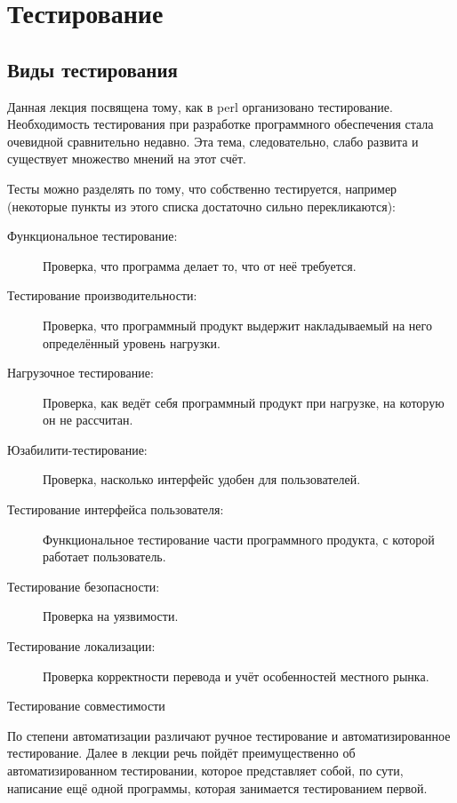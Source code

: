 \setcounter{chapter}{10}
\chapter{Тестирование}

\section{Виды тестирования}
Данная лекция посвящена тому, как в perl организовано тестирование. Необходимость тестирования при разработке программного обеспечения стала очевидной сравнительно недавно. Эта тема, следовательно, слабо развита и существует множество мнений на этот счёт.

Тесты можно разделять по тому, что собственно тестируется, например (некоторые пункты из этого списка достаточно сильно перекликаются):
\begin{description}
  \item[Функциональное тестирование:]
    Проверка, что программа делает то, что от неё требуется.
  \item[Тестирование производительности:]
    Проверка, что программный продукт выдержит накладываемый на него определённый уровень нагрузки.
  \item[Нагрузочное тестирование:]
    Проверка, как ведёт себя программный продукт при нагрузке, на которую он не рассчитан.
  \item[Юзабилити-тестирование:]
    Проверка, насколько интерфейс удобен для пользователей.
  \item[Тестирование интерфейса пользователя:]
    Функциональное тестирование части программного продукта, с которой работает пользователь.
  \item[Тестирование безопасности:]
    Проверка на уязвимости.
  \item[Тестирование локализации:]
    Проверка корректности перевода и учёт особенностей местного рынка.
  \item[Тестирование совместимости]
\end{description}

По степени автоматизации различают ручное тестирование и автоматизированное тестирование. Далее в лекции речь пойдёт преимущественно об автоматизированном тестировании, которое представляет собой, по сути, написание ещё одной программы, которая занимается тестированием первой.

